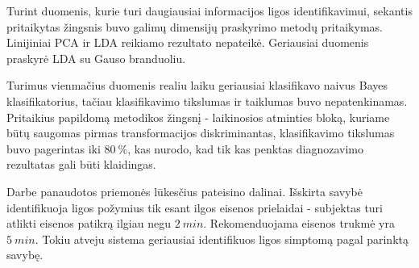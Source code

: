 \documentclass[a4paper,11pt,twocolumn]{IEEEtran}
\begin{document}
	Turint duomenis, kurie turi daugiausiai informacijos ligos identifikavimui, sekantis pritaikytas žingsnis buvo galimų dimensijų praskyrimo metodų pritaikymas. Linijiniai PCA ir LDA reikiamo rezultato nepateikė. Geriausiai duomenis praskyrė LDA su Gauso branduoliu. 

	Turimus vienmačius duomenis realiu laiku geriausiai klasifikavo naivus Bayes klasifikatorius, tačiau klasifikavimo tikslumas ir taiklumas buvo nepatenkinamas. Pritaikius papildomą metodikos žingsnį - laikinosios atminties bloką, kuriame būtų saugomas pirmas transformacijos diskriminantas, klasifikavimo tikslumas buvo pagerintas iki $80~\%$, kas nurodo, kad tik kas penktas diagnozavimo rezultatas gali būti klaidingas.
	
	Darbe panaudotos priemonės lūkesčius pateisino dalinai. Išskirta savybė identifikuoja ligos požymius tik esant ilgos eisenos prielaidai - subjektas turi atlikti eisenos patikrą ilgiau negu $2~min$. Rekomenduojama eisenos trukmė yra $5~min$. Tokiu atveju sistema geriausiai identifikuos ligos simptomą pagal parinktą savybę.
\end{document}
